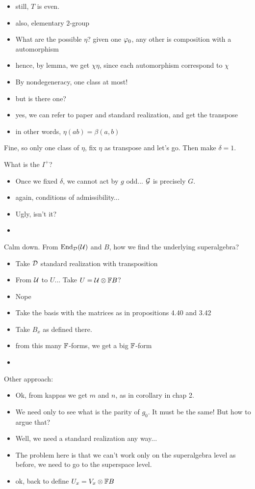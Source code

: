 \begin{itemize}
    \item still, $T$ is even.
    \item also, elementary $2$-group
    \item What are the possible $\eta$? given one $\varphi_0$, any other is composition with a automorphism
    \item hence, by lemma, we get $\chi \eta$, since each automorphism correspond to $\chi$
    \item By nondegeneracy, one class at most!
    \item but is there one?
    \item yes, we can refer to paper and standard realization, and get the transpose
    \item in other words, $\eta(ab) = \beta(a,b)$
\end{itemize}

Fine, so only one class of $\eta$, fix $\eta$ as transpose and let's go. 
Then make $\delta = 1$. 

What is the $I^+$? 

\begin{itemize}
    \item Once we fixed $\delta$, we cannot act by $g$ odd... $\mathcal G$ is precisely $G$.
    \item again, conditions of admissibility...
    \item Ugly, isn't it?
    \item 
\end{itemize}

Calm down. 
From $\operatorname{End}_{\mathcal{D}}(\mathcal U)$ and $B$, how we find the underlying superalgebra?

\begin{itemize}
    \item Take $\mathcal{D}$ standard realization with transposition
    \item From $\mathcal U$ to $U$... Take $U = \mathcal U \otimes \mathbb{F} B$?
    \item Nope
    \item Take the basis with the matrices as in propositions 4.40 and 3.42
    \item Take $B_x$ as defined there.
    \item from this many $\mathbb{F}$-forms, we get a big $\mathbb{F}$-form
    \item 
\end{itemize}

Other approach:

\begin{itemize}
    \item Ok, from kappas we get $m$ and $n$, as in corollary in chap 2.
    \item We need only to see what is the parity of $g_0$. 
    It must be the same! 
    But how to argue that?
    \item Well, we need a standard realization any way...
    \item The problem here is that we can't work only on the superalgebra level as before, we need to go to the superspace level.
    \item ok, back to define $U_x = V_x \otimes \mathbb{F} B$
\end{itemize}